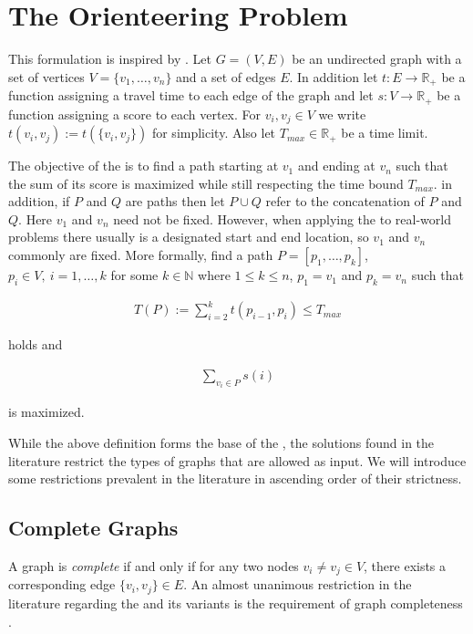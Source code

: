 \section{The Orienteering Problem} %
\label{sec:02:problem}

This formulation is inspired by \citeauthor{vansteenwegen_orienteering_2011} \cite{vansteenwegen_orienteering_2011}.
Let $G=(V,E)$ be an undirected graph with a set of vertices $V = \{v_1, \dots, v_n\}$ and a set of edges $E$.
In addition let $t: E \rightarrow \mathbb{R}_+$ be a function assigning a travel time to each edge of the graph and let
$s: V \rightarrow \mathbb{R}_+$ be a function assigning a score to each vertex.
For $v_i, v_j \in V$ we write $t(v_i, v_j) := t(\{v_i, v_j\})$ for simplicity.
Also let $T_{max} \in \mathbb{R}_+$ be a time limit.

The objective of the \oplong{} is to find a path starting at $v_1$ and ending at $v_n$
such that the sum of its score is maximized while still respecting the time bound $T_{max}$.
in addition, if $P$ and $Q$ are paths then let $P \cup Q$ refer to the concatenation of $P$ and $Q$.
Here $v_1$ and $v_n$ need not be fixed.
However, when applying the \op{} to real-world problems there usually is a designated start and end location,
so $v_1$ and $v_n$ commonly are fixed.
More formally, find a path $P = [p_1, \dots, p_k]$, $p_i \in V,\ i=1,\dots, k$ for some $k \in \mathbb{N}$ where $1 \leq k \leq n$,  $p_1 = v_1$ and $p_k = v_n$ such that

\begin{align*}
	T(P) := \sum_{i = 2}^k t(p_{i-1}, p_i) \leq T_{max}
\end{align*}

holds and

\begin{align*}
	\sum_{v_i \in P} s(i)
\end{align*}

is maximized.

While the above definition forms the base of the \op{}, the solutions found in the literature restrict the types of graphs that are allowed as input.
We will introduce some restrictions prevalent in the literature in ascending order of their strictness.

\subsection{Complete Graphs}
\label{subsec:02:complete}

A graph is \emph{complete} if and only if for any two nodes $v_i \neq v_j \in V$, there exists a corresponding edge $\{v_i, v_j\} \in E$.
An almost unanimous \cite{vansteenwegen_orienteering_2011} restriction in the literature regarding the \op{} and its variants is the requirement of graph completeness \cite{szwarc_novel_2022,vansteenwegen_orienteering_2011,laporte_selective_1990,santini_hazardous_2022}.

